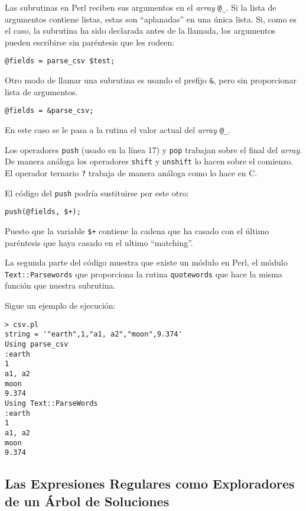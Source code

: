 Las subrutinas  en Perl reciben sus argumentos en el \emph{array}
\verb|@_|. Si la lista de argumentos contiene listas, estas 
son ``aplanadas'' en una única lista. Si, como es el caso, la subrutina
ha sido declarada antes de la llamada, los argumentos pueden
escribirse sin paréntesis que les rodeen:
\begin{verbatim}
@fields = parse_csv $test;
\end{verbatim}

Otro modo de llamar una subrutina es usando el prefijo \verb|&|,
pero sin proporcionar lista de argumentos.
\begin{verbatim}
@fields = &parse_csv;
\end{verbatim}
En este caso se le pasa a la rutina el valor actual del  \emph{array} \verb|@_|.

Los operadores \verb|push| (usado en la línea 17) y \verb|pop| trabajan
sobre el final del \emph{array}. De manera análoga los operadores
\verb|shift| y \verb|unshift| lo hacen sobre el comienzo.
El operador ternario \verb|?| trabaja de manera análoga como lo hace en C.

El código del \verb|push| podría sustituirse por este otro:
\begin{verbatim}
push(@fields, $+);
\end{verbatim}
Puesto que la variable \verb|$+| contiene la cadena que ha casado
con el último paréntesis que haya casado en el ultimo ``matching''.

La segunda parte del código muestra que existe un 
módulo en Perl, el módulo \verb|Text::Parsewords| que proporciona la rutina \verb|quotewords| que hace la misma función que nuestra subrutina.

Sigue un ejemplo de ejecución:
\begin{verbatim}
> csv.pl
string = '"earth",1,"a1, a2","moon",9.374'
Using parse_csv
:earth
1
a1, a2
moon
9.374
Using Text::ParseWords
:earth
1
a1, a2
moon
9.374    
\end{verbatim}

\subsection{Las Expresiones Regulares como Exploradores de un Árbol de Soluciones}


